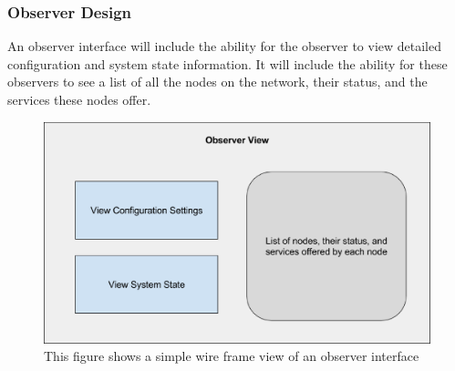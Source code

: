 \documentclass[draftclsnofoot, onecolumn, compsoc, 10pt]{IEEEtran}
\begin{document}
\subsubsection{Observer Design}
An observer interface will include the ability for the observer to view detailed configuration and system state information. It will include the ability for these observers to see a list of all the nodes on the network, their status, and the services these nodes offer.
\begin{figure}[H]
\centering
\includegraphics[scale=0.4]{observer}
\captionsetup{justification=centering}
\caption{This figure shows a simple wire frame view of an observer interface}
\end{figure}
\end{document}
